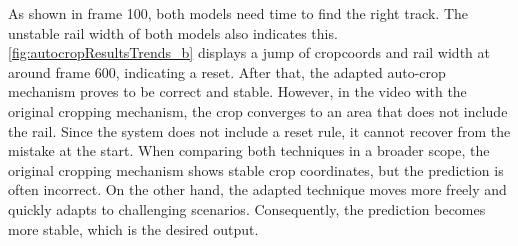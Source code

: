 As shown in frame 100, both models need time to find the right track.
The unstable rail width of both models also indicates this.
\autoref{fig:autocropResultsTrends_b} displays a jump of cropcoords and rail width at around frame 600, indicating a reset.
After that, the adapted auto-crop mechanism proves to be correct and stable.
However, in the video with the original cropping mechanism, the crop converges to an area that does not include the rail.
Since the system does not include a reset rule, it cannot recover from the mistake at the start.
When comparing both techniques in a broader scope, the original cropping mechanism shows stable crop coordinates, but the prediction is often incorrect.
On the other hand, the adapted technique moves more freely and quickly adapts to challenging scenarios.
Consequently, the prediction becomes more stable, which is the desired output.